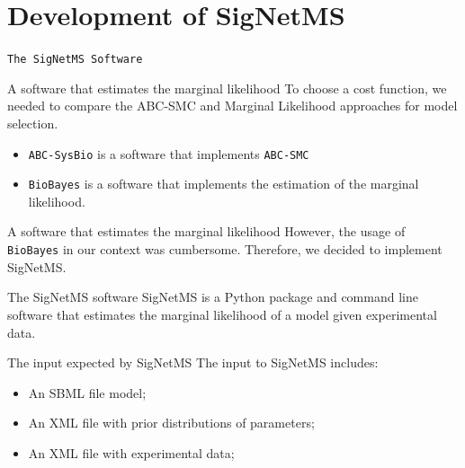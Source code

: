 \documentclass{beamer}
\begin{document}
\section{Development of SigNetMS}

\begin{frame}{}
\begin{center}
    \texttt{The SigNetMS Software}
\end{center}
\end{frame}

\begin{frame}{A software that estimates the marginal likelihood}
To choose a cost function, we needed to compare the ABC-SMC and Marginal
Likelihood approaches for model selection.
\pause
\begin{itemize}
    \item{\texttt{ABC-SysBio} is a software that implements
        \texttt{ABC-SMC}}
    \item{\texttt{BioBayes} is a software that implements the estimation
        of the marginal likelihood.}
\end{itemize}
\end{frame}

\begin{frame}{A software that estimates the marginal likelihood}
However, the usage of \texttt{BioBayes} in our context was cumbersome.
\pause
Therefore, we decided to implement \alert{SigNetMS}.
\end{frame}

\begin{frame}{The SigNetMS software}
SigNetMS is a Python package and command line software that estimates 
the marginal likelihood of a model given experimental data.
\end{frame}

\begin{frame}{The input expected by SigNetMS}
The input to SigNetMS includes:
\begin{itemize}
    \item{An SBML file model;}
    \item{An XML file with prior distributions of parameters;}
    \item{An XML file with experimental data;}
\end{itemize}
\end{frame}
\end{document}
